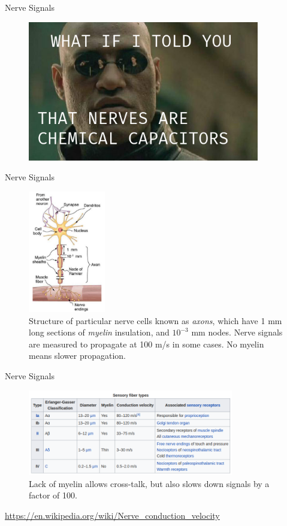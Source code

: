 \documentclass{beamer}
\begin{document}
\begin{frame}{Nerve Signals}
\begin{figure}
\centering
\includegraphics[width=0.9\textwidth]{figures/Matrix-Morpheus.png}
\end{figure}
\end{frame}

\begin{frame}{Nerve Signals}
\begin{figure}
\centering
\includegraphics[width=0.3\textwidth]{figures/nerve1.png}
\caption{\label{fig:nerve1}  Structure of particular nerve cells known as \textit{axons}, which have 1 mm long sections of \textit{myelin} insulation, and $10^{-3}$ mm nodes.  Nerve signals are measured to propagate at 100 m/s in some cases.  No myelin means slower propagation.}
\end{figure}
\end{frame}

\begin{frame}{Nerve Signals}
\begin{figure}
\centering
\includegraphics[width=0.8\textwidth]{figures/SensoryWiki.png}
\caption{\label{fig:sense} Lack of myelin allows cross-talk, but also slows down signals by a factor of 100.}
\end{figure}
\url{https://en.wikipedia.org/wiki/Nerve_conduction_velocity}
\end{frame}
\end{document}
